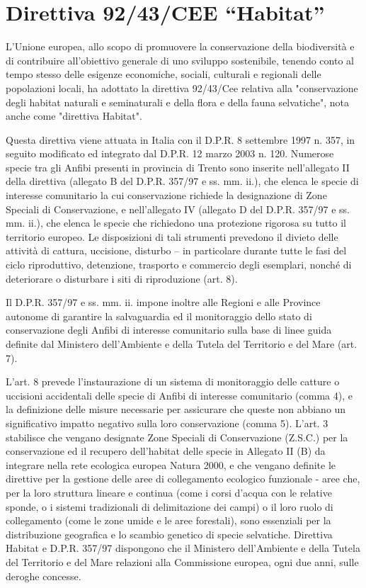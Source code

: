 \documentclass[11pt,a4paper,twoside]{memoir}
\begin{document}
\section{Direttiva 92/43/CEE “Habitat”}
\label{sec:norme_habitat}
L'Unione europea, allo scopo di promuovere la conservazione della biodiversità e di contribuire all'obiettivo generale di uno sviluppo sostenibile, tenendo conto al tempo stesso delle esigenze economiche, sociali, culturali e regionali delle popolazioni locali, ha adottato la direttiva 92/43/Cee relativa alla "conservazione degli habitat naturali e seminaturali e della flora e della fauna selvatiche", nota anche come "direttiva Habitat".

Questa direttiva viene attuata in Italia con il D.P.R. 8 settembre 1997 n. 357, in seguito modificato ed integrato dal D.P.R. 12 marzo 2003 n. 120. Numerose specie tra gli Anfibi presenti in provincia di Trento sono inserite nell'allegato II della direttiva (allegato B del D.P.R. 357/97 e ss. mm. ii.), che elenca le specie di interesse comunitario la cui conservazione richiede la designazione di Zone Speciali di Conservazione, e nell’allegato IV (allegato D del D.P.R. 357/97 e ss. mm. ii.), che elenca le specie che richiedono una protezione rigorosa su tutto il territorio europeo. Le disposizioni di tali strumenti prevedono il divieto delle attività di cattura, uccisione, disturbo – in particolare durante tutte le fasi del ciclo riproduttivo, detenzione, trasporto e commercio degli esemplari, nonché di deteriorare o disturbare i siti di riproduzione (art. 8).

Il D.P.R. 357/97 e ss. mm. ii. impone inoltre alle Regioni e alle Province autonome di garantire la salvaguardia ed il monitoraggio dello stato di conservazione degli Anfibi di interesse comunitario sulla base di linee guida definite dal Ministero dell'Ambiente e della Tutela del Territorio e del Mare (art. 7).

L’art. 8 prevede l’instaurazione di un sistema di monitoraggio delle catture o uccisioni accidentali delle specie di Anfibi di interesse comunitario (comma 4), e la definizione delle misure necessarie per assicurare che queste non abbiano un significativo impatto negativo sulla loro conservazione (comma 5). L’art. 3 stabilisce che vengano designate Zone Speciali di Conservazione (Z.S.C.) per la conservazione ed il recupero dell’habitat delle specie in Allegato II (B) da integrare nella rete ecologica europea Natura 2000, e che vengano definite le direttive per la gestione delle aree di collegamento ecologico funzionale - aree che, per la loro struttura lineare e continua (come i corsi d'acqua con le relative sponde, o i sistemi tradizionali di delimitazione dei campi) o il loro ruolo di collegamento (come le zone umide e le aree forestali), sono essenziali per la distribuzione geografica e lo scambio genetico di specie selvatiche. Direttiva Habitat e D.P.R. 357/97 dispongono che il Ministero dell’Ambiente e della Tutela del Territorio e del Mare relazioni alla Commissione europea, ogni due anni, sulle deroghe concesse.
\end{document}
